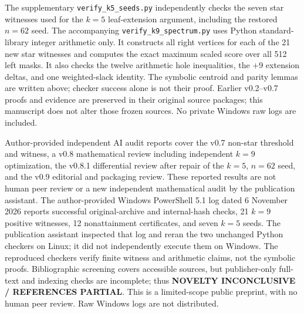 \documentclass[11pt,a4paper]{article}
\begin{document}
The supplementary \texttt{verify\_k5\_seeds.py} independently checks the seven star witnesses used for the $k=5$ leaf-extension argument, including the restored $n=62$ seed. The accompanying \texttt{verify\_k9\_spectrum.py} uses Python standard-library integer arithmetic only. It constructs all right vertices for each of the 21 new star witnesses and computes the exact maximum scaled score over all 512 left masks. It also checks the twelve arithmetic hole inequalities, the $+9$ extension deltas, and one weighted-slack identity. The symbolic centroid and parity lemmas are written above; checker success alone is not their proof. Earlier v0.2--v0.7 proofs and evidence are preserved in their original source packages; this manuscript does not alter those frozen sources. No private Windows raw logs are included.

Author-provided independent AI audit reports cover the v0.7 non-star threshold and witness, a v0.8 mathematical review including independent $k=9$ optimization, the v0.8.1 differential review after repair of the $k=5$, $n=62$ seed, and the v0.9 editorial and packaging review. These reported results are not human peer review or a new independent mathematical audit by the publication assistant. The author-provided Windows PowerShell 5.1 log dated 6 November 2026 reports successful original-archive and internal-hash checks, 21 $k=9$ positive witnesses, 12 nonattainment certificates, and seven $k=5$ seeds. The publication assistant inspected that log and reran the two unchanged Python checkers on Linux; it did not independently execute them on Windows. The reproduced checkers verify finite witness and arithmetic claims, not the symbolic proofs. Bibliographic screening covers accessible sources, but publisher-only full-text and indexing checks are incomplete; thus \textbf{NOVELTY INCONCLUSIVE / REFERENCES PARTIAL}. This is a limited-scope public preprint, with no human peer review. Raw Windows logs are not distributed.
\end{document}
